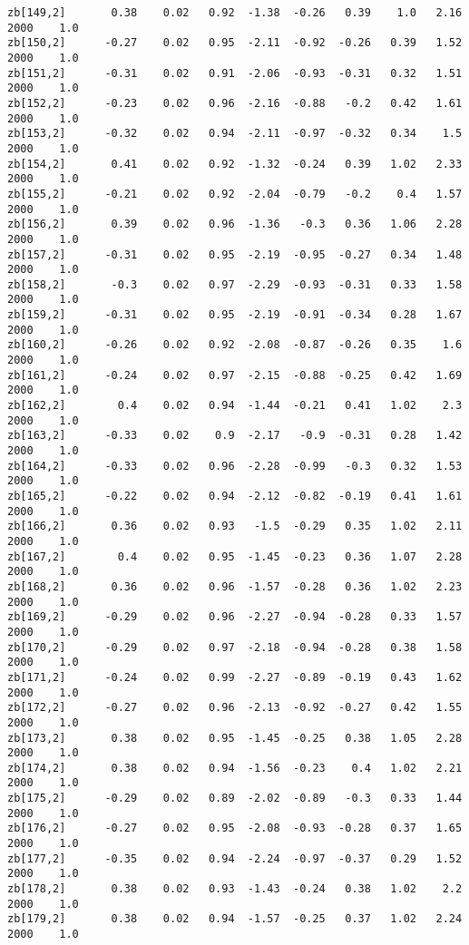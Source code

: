 \documentclass[11pt]{article}
\begin{document}
\begin{Verbatim}[commandchars=\\\{\}]
zb[149,2]       0.38    0.02   0.92  -1.38  -0.26   0.39    1.0   2.16   2000    1.0
zb[150,2]      -0.27    0.02   0.95  -2.11  -0.92  -0.26   0.39   1.52   2000    1.0
zb[151,2]      -0.31    0.02   0.91  -2.06  -0.93  -0.31   0.32   1.51   2000    1.0
zb[152,2]      -0.23    0.02   0.96  -2.16  -0.88   -0.2   0.42   1.61   2000    1.0
zb[153,2]      -0.32    0.02   0.94  -2.11  -0.97  -0.32   0.34    1.5   2000    1.0
zb[154,2]       0.41    0.02   0.92  -1.32  -0.24   0.39   1.02   2.33   2000    1.0
zb[155,2]      -0.21    0.02   0.92  -2.04  -0.79   -0.2    0.4   1.57   2000    1.0
zb[156,2]       0.39    0.02   0.96  -1.36   -0.3   0.36   1.06   2.28   2000    1.0
zb[157,2]      -0.31    0.02   0.95  -2.19  -0.95  -0.27   0.34   1.48   2000    1.0
zb[158,2]       -0.3    0.02   0.97  -2.29  -0.93  -0.31   0.33   1.58   2000    1.0
zb[159,2]      -0.31    0.02   0.95  -2.19  -0.91  -0.34   0.28   1.67   2000    1.0
zb[160,2]      -0.26    0.02   0.92  -2.08  -0.87  -0.26   0.35    1.6   2000    1.0
zb[161,2]      -0.24    0.02   0.97  -2.15  -0.88  -0.25   0.42   1.69   2000    1.0
zb[162,2]        0.4    0.02   0.94  -1.44  -0.21   0.41   1.02    2.3   2000    1.0
zb[163,2]      -0.33    0.02    0.9  -2.17   -0.9  -0.31   0.28   1.42   2000    1.0
zb[164,2]      -0.33    0.02   0.96  -2.28  -0.99   -0.3   0.32   1.53   2000    1.0
zb[165,2]      -0.22    0.02   0.94  -2.12  -0.82  -0.19   0.41   1.61   2000    1.0
zb[166,2]       0.36    0.02   0.93   -1.5  -0.29   0.35   1.02   2.11   2000    1.0
zb[167,2]        0.4    0.02   0.95  -1.45  -0.23   0.36   1.07   2.28   2000    1.0
zb[168,2]       0.36    0.02   0.96  -1.57  -0.28   0.36   1.02   2.23   2000    1.0
zb[169,2]      -0.29    0.02   0.96  -2.27  -0.94  -0.28   0.33   1.57   2000    1.0
zb[170,2]      -0.29    0.02   0.97  -2.18  -0.94  -0.28   0.38   1.58   2000    1.0
zb[171,2]      -0.24    0.02   0.99  -2.27  -0.89  -0.19   0.43   1.62   2000    1.0
zb[172,2]      -0.27    0.02   0.96  -2.13  -0.92  -0.27   0.42   1.55   2000    1.0
zb[173,2]       0.38    0.02   0.95  -1.45  -0.25   0.38   1.05   2.28   2000    1.0
zb[174,2]       0.38    0.02   0.94  -1.56  -0.23    0.4   1.02   2.21   2000    1.0
zb[175,2]      -0.29    0.02   0.89  -2.02  -0.89   -0.3   0.33   1.44   2000    1.0
zb[176,2]      -0.27    0.02   0.95  -2.08  -0.93  -0.28   0.37   1.65   2000    1.0
zb[177,2]      -0.35    0.02   0.94  -2.24  -0.97  -0.37   0.29   1.52   2000    1.0
zb[178,2]       0.38    0.02   0.93  -1.43  -0.24   0.38   1.02    2.2   2000    1.0
zb[179,2]       0.38    0.02   0.94  -1.57  -0.25   0.37   1.02   2.24   2000    1.0

\end{Verbatim}
\end{document}
